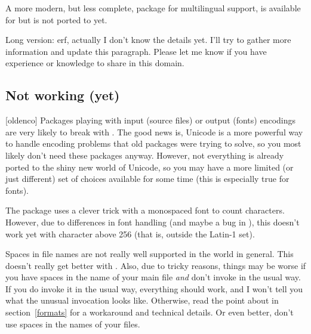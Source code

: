 \documentclass{lltxdoc}
\begin{document}
A more modern, but less complete, package for multilingual support,
 is available for \xelatex but is not ported to \lualatex yet.

Long version: erf, actually I don't know the details yet. I'll try to gather
more information and update this paragraph. Please let me know if you have
experience or knowledge to share in this domain.

\subsection{Not working (yet)}\label{notworking}

[oldenco] Packages playing with input (source files) or
output (fonts) encodings are very likely to break with \luatex. The good news
is, Unicode is a more powerful way to handle encoding problems that old
packages were trying to solve, so you most likely don't need these packages
anyway. However, not everything is already ported to the shiny new world of
Unicode, so you may have a more limited (or just different) set of choices
available for some time (this is especially true for fonts).

 The  package uses a clever trick with a monospaced font
to count characters. However, due to differences in font handling (and maybe a
bug in \luatex), this doesn't work yet with character above 256 (that is,
outside the Latin-1 set).

 Spaces in file names are not really well supported in the \tex
world in general. This doesn't really get better with \luatex. Also, due to
tricky reasons, things may be worse if you have spaces in the name of your main
\tex file \emph{and} don't invoke \luatex in the usual way. If you do
invoke it in the usual way, everything should work, and I won't tell you what
the unusual invocation looks like. Otherwise, read the point about
 in section~\ref{formats} for a workaround and technical
details. Or even better, don't use spaces in the names of your \tex files.
\end{document}
